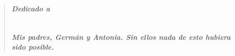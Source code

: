 \newpage
\thispagestyle{empty}

~

\cleardoublepage
{}
\thispagestyle{empty}

\vspace{6cm}

\begin{quotation}
\noindent \begin{center}
\textbf{\emph{\Large Dedicado a}}\textbf{\emph{\large }}\\
\textbf{\emph{\large }}\\
\textbf{\emph{\large }}\\
\textbf{\emph{\large Mis padres, Germán y Antonia. Sin ellos nada de esto hubiera sido posible.}}
\par\end{center}{\large \par}
\end{quotation}
\newpage
\thispagestyle{empty}

~\newpage
\thispagestyle{empty}



